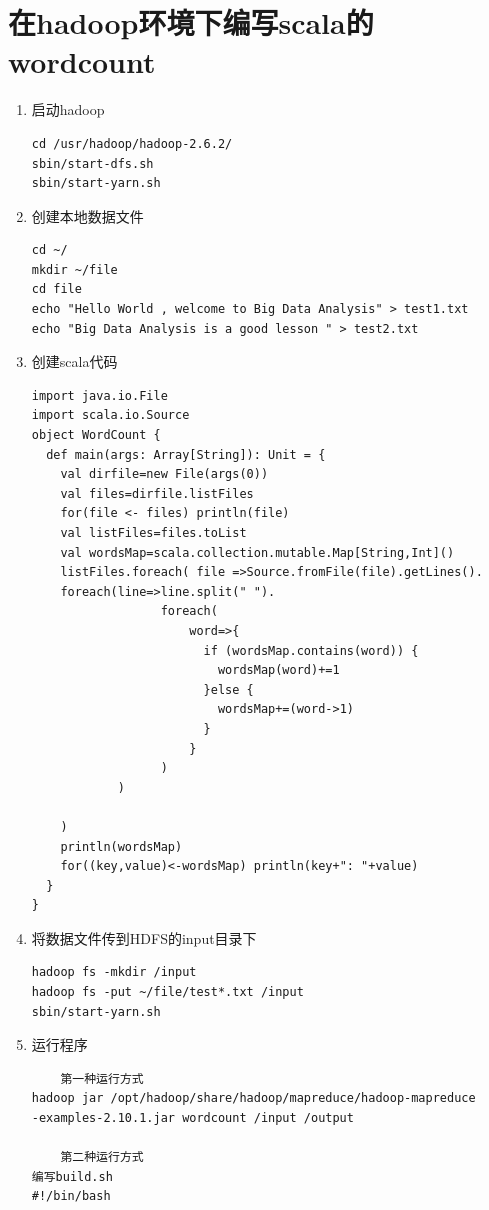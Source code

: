 \documentclass{article}
\begin{document}
\section{在hadoop环境下编写scala的wordcount}
\begin{enumerate}
    \item 启动hadoop
    \begin{lstlisting}
cd /usr/hadoop/hadoop-2.6.2/
sbin/start-dfs.sh
sbin/start-yarn.sh
    \end{lstlisting}

    \item 创建本地数据文件
    \begin{lstlisting}
cd ~/
mkdir ~/file
cd file
echo "Hello World , welcome to Big Data Analysis" > test1.txt
echo "Big Data Analysis is a good lesson " > test2.txt
    \end{lstlisting}

    \item 创建scala代码
    \begin{lstlisting}
import java.io.File
import scala.io.Source
object WordCount {
  def main(args: Array[String]): Unit = {
    val dirfile=new File(args(0))
    val files=dirfile.listFiles
    for(file <- files) println(file)
    val listFiles=files.toList
    val wordsMap=scala.collection.mutable.Map[String,Int]()
    listFiles.foreach( file =>Source.fromFile(file).getLines().
    foreach(line=>line.split(" ").
                  foreach(
                      word=>{
                        if (wordsMap.contains(word)) {
                          wordsMap(word)+=1
                        }else {
                          wordsMap+=(word->1)
                        }
                      }
                  )
            )

    )
    println(wordsMap)
    for((key,value)<-wordsMap) println(key+": "+value)
  }
}
    \end{lstlisting}
    \item 将数据文件传到HDFS的input目录下
    \begin{lstlisting}
hadoop fs -mkdir /input
hadoop fs -put ~/file/test*.txt /input
sbin/start-yarn.sh
    \end{lstlisting}
    \item 运行程序
    \begin{lstlisting}
    第一种运行方式
hadoop jar /opt/hadoop/share/hadoop/mapreduce/hadoop-mapreduce
-examples-2.10.1.jar wordcount /input /output

    第二种运行方式
编写build.sh
#!/bin/bash


\end{lstlisting}
\end{enumerate}
\end{document}
